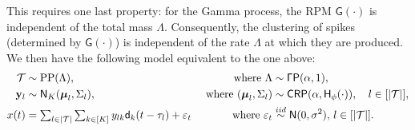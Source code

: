 This requires one last property: for the Gamma process, the RPM $\mathsf{G}(\cdot)$ is independent of the total mass $\Lambda$. 
Consequently, the clustering of spikes (determined by $\mathsf{G}(\cdot)$) is independent of the rate $\Lambda$ at which they are produced. We then have
 the following model equivalent to the one above:
\begin{subequations}
\begin{align}
  \mathcal{T} &\sim \text{PP}(\Lambda), \qquad &\text{ where } \Lambda  &\sim \mathsf{\Gamma P}(\alpha, 1),
   \\
  \mathbf{y}_l &\sim \mathsf{N}_K(\boldsymbol{\mu}_{l}, \Sigma_{l}), \qquad &\text{ where } (\boldsymbol{\mu}_{l}, \Sigma_{l})  &\sim {\mathsf{CRP}}(\alpha, \mathsf{H}_{\phi}(\cdot)), \quad  l \in [|\mathcal{T}|],   \label{eq:CRP}\\
  x(t) &=   \textstyle{\sum_{l \in |\mathcal{T}|}} \sum_{k \in [K]} y_{lk} \mathsf{d}_k(t - \tau_{l}) + \varepsilon_t  &\text{ where }  \varepsilon_t &\overset{iid}{\sim} \mathsf{N}(0,\sigma^2),  \,  l \in [|\mathcal{T}|].   \label{eq:CRP_mix}
\end{align} \label{eq:marked_pp}
\end{subequations}


